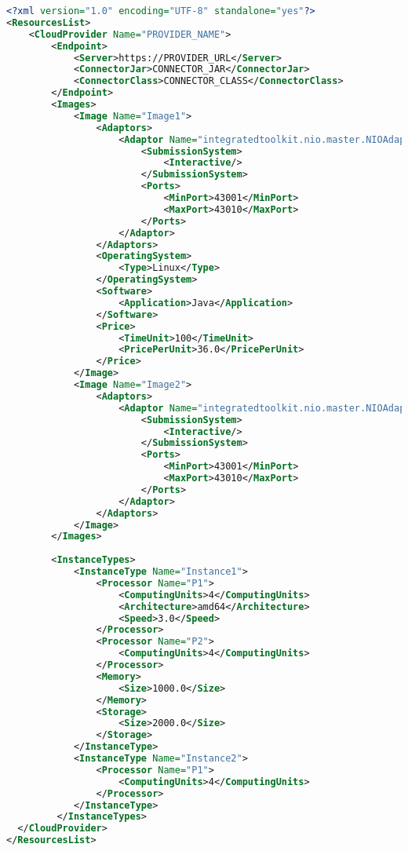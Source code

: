 \newpage

\begin{lstlisting}[language=xml]
<?xml version="1.0" encoding="UTF-8" standalone="yes"?>
<ResourcesList>
    <CloudProvider Name="PROVIDER_NAME">
        <Endpoint>
            <Server>https://PROVIDER_URL</Server>
            <ConnectorJar>CONNECTOR_JAR</ConnectorJar>
            <ConnectorClass>CONNECTOR_CLASS</ConnectorClass>
        </Endpoint>
        <Images>
            <Image Name="Image1">
                <Adaptors>
                    <Adaptor Name="integratedtoolkit.nio.master.NIOAdaptor">
                        <SubmissionSystem>
                            <Interactive/>
                        </SubmissionSystem>
                        <Ports>
                            <MinPort>43001</MinPort>
                            <MaxPort>43010</MaxPort>
                        </Ports>
                    </Adaptor>
                </Adaptors>
                <OperatingSystem>
                    <Type>Linux</Type>
                </OperatingSystem>
                <Software>
                    <Application>Java</Application>
                </Software>
                <Price>
                    <TimeUnit>100</TimeUnit>
                    <PricePerUnit>36.0</PricePerUnit>
                </Price>
            </Image>
            <Image Name="Image2">
                <Adaptors>
                    <Adaptor Name="integratedtoolkit.nio.master.NIOAdaptor">
                        <SubmissionSystem>
                            <Interactive/>
                        </SubmissionSystem>
                        <Ports>
                            <MinPort>43001</MinPort>
                            <MaxPort>43010</MaxPort>
                        </Ports>
                    </Adaptor>
                </Adaptors>
            </Image>
        </Images>
    
        <InstanceTypes>
            <InstanceType Name="Instance1">
                <Processor Name="P1">
                    <ComputingUnits>4</ComputingUnits>
                    <Architecture>amd64</Architecture>
                    <Speed>3.0</Speed>
                </Processor>
                <Processor Name="P2">
                    <ComputingUnits>4</ComputingUnits>
                </Processor>
                <Memory>
                    <Size>1000.0</Size>
                </Memory>
                <Storage>
                    <Size>2000.0</Size>
                </Storage>
            </InstanceType>
            <InstanceType Name="Instance2">
                <Processor Name="P1">
                    <ComputingUnits>4</ComputingUnits>
                </Processor>
            </InstanceType>
         </InstanceTypes>
  </CloudProvider>
</ResourcesList>
\end{lstlisting}

